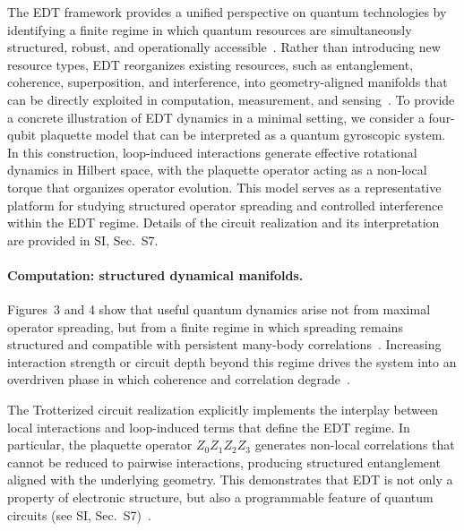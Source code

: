 \documentclass[twocolumn,10pt]{article}
\begin{document}

The EDT framework provides a unified perspective on quantum technologies by identifying a finite regime in which quantum resources are simultaneously structured, robust, and operationally accessible~\cite{Horodecki2009,Streltsov2017}. Rather than introducing new resource types, EDT reorganizes existing resources, such as entanglement, coherence, superposition, and interference, into geometry-aligned manifolds that can be directly exploited in computation, measurement, and sensing~\cite{Amico2008,Verstraete2008}. To provide a concrete illustration of EDT dynamics in a minimal setting, we consider a four-qubit plaquette model that can be interpreted as a quantum gyroscopic system. In this construction, loop-induced interactions generate effective rotational dynamics in Hilbert space, with the plaquette operator acting as a non-local torque that organizes operator evolution. This model serves as a representative platform for studying structured operator spreading and controlled interference within the EDT regime. Details of the circuit realization and its interpretation are provided in SI, Sec.~S7.

\paragraph*{Computation: structured dynamical manifolds.}
Figures~3 and 4 show that useful quantum dynamics arise not from maximal operator spreading, but from a finite regime in which spreading remains structured and compatible with persistent many-body correlations~\cite{Swingle2018,Choi2016}. Increasing interaction strength or circuit depth beyond this regime drives the system into an overdriven phase in which coherence and correlation degrade~\cite{Altman2015}.

The Trotterized circuit realization explicitly implements the interplay between local interactions and loop-induced terms that define the EDT regime. In particular, the plaquette operator $Z_0 Z_1 Z_2 Z_3$ generates non-local correlations that cannot be reduced to pairwise interactions, producing structured entanglement aligned with the underlying geometry. This demonstrates that EDT is not only a property of electronic structure, but also a programmable feature of quantum circuits (see SI, Sec.~S7)~\cite{Lloyd1996,Childs2019,Trotter1959,Suzuki1990}.
\end{document}
